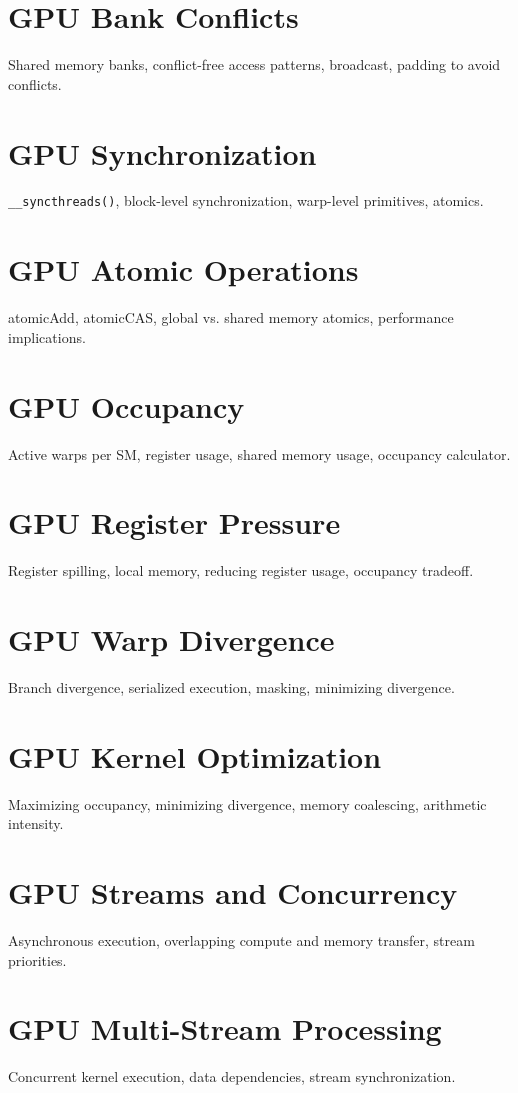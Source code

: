 \chapter{GPU Bank Conflicts}
Shared memory banks, conflict-free access patterns, broadcast, padding to avoid conflicts.

\chapter{GPU Synchronization}
\texttt{\_\_syncthreads()}, block-level synchronization, warp-level primitives, atomics.

\chapter{GPU Atomic Operations}
atomicAdd, atomicCAS, global vs. shared memory atomics, performance implications.

\chapter{GPU Occupancy}
Active warps per SM, register usage, shared memory usage, occupancy calculator.

\chapter{GPU Register Pressure}
Register spilling, local memory, reducing register usage, occupancy tradeoff.

\chapter{GPU Warp Divergence}
Branch divergence, serialized execution, masking, minimizing divergence.

\chapter{GPU Kernel Optimization}
Maximizing occupancy, minimizing divergence, memory coalescing, arithmetic intensity.

\chapter{GPU Streams and Concurrency}
Asynchronous execution, overlapping compute and memory transfer, stream priorities.

\chapter{GPU Multi-Stream Processing}
Concurrent kernel execution, data dependencies, stream synchronization.

